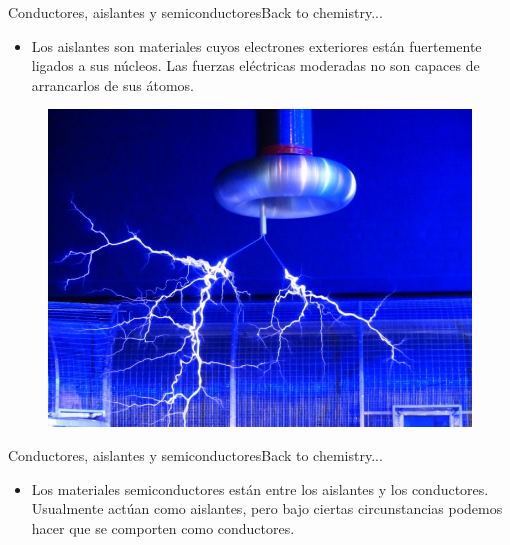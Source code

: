 \documentclass[10pt]{beamer}
\begin{document}
\begin{frame}{Conductores, aislantes y semiconductores}{Back to chemistry...}

\begin{itemize}
    \item Los aislantes son materiales cuyos electrones exteriores están fuertemente ligados a sus núcleos. Las fuerzas eléctricas moderadas no son capaces de arrancarlos de sus átomos.
\end{itemize}
\medskip
\begin{figure}[h!]
\centering
\includegraphics [scale=0.25]{voltaicarc}
\label{fig:first}
\end{figure}
\end{frame}


\begin{frame}{Conductores, aislantes y semiconductores}{Back to chemistry...}

\begin{itemize}
    \item Los materiales semiconductores están entre los aislantes y los conductores. Usualmente actúan como aislantes, pero bajo ciertas circunstancias podemos hacer que se comporten como conductores.
\end{itemize}
\medskip
\medskip
\begin{columns}[c]
\column{1.5in}
\column{1.5in}
\end{columns}
\end{frame}
\end{document}
